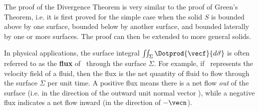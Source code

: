 
The proof of the Divergence Theorem is very similar to the proof of Green's Theorem, i.e. it is first proved for the simple case when the solid $S$ is bounded above by one surface, bounded below by another surface, and bounded laterally by one or more surfaces. The proof can then be extended to more general solids.%


In physical applications, the surface integral $\iint_{\Sigma} \Dotprod{\vecf}{d\vec\sigma}$ is often referred to as the \textbf{flux} of \vecf\ through the surface $\Sigma$. For example, if \vecf\ represents the velocity field of a fluid, then the flux is the net quantity of fluid to flow through the surface $\Sigma$ per unit time. A positive flux means there is a net flow \emph{out} of the surface (i.e. in the direction of the outward unit normal vector \vecn), while a negative flux indicates a net flow inward (in the direction of $-\vecn$).

